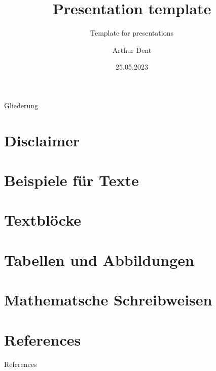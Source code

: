 \documentclass[aspectratio=169, 10pt]{beamer}
\title[HAW Hamburg Projector]{Presentation template}
\subtitle{Template for presentations}
\author{Arthur Dent}
\institute{Hochschule für Angewandte Wissenschaften Hamburg}
\date{25.05.2023}
\begin{document}
\maketitle



\begin{frame}{Gliederung}
  \tableofcontents
\end{frame}


\section{Disclaimer}



\section{Beispiele für Texte}



\section{Textblöcke}


\section{Tabellen und Abbildungen}



\section{Mathematsche Schreibweisen}



\section{References}



\begin{frame}[allowframebreaks]{References}
  \printbibliography
\end{frame}
\end{document}
